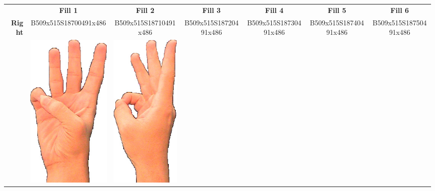 \documentclass{article}
\begin{document}
\begin{center}
\begin{tabular}{r*{6}{c}}
&\textbf{Fill 1}&\textbf{Fill 2}&\textbf{Fill 3}&\textbf{Fill 4}&\textbf{Fill 5}&\textbf{Fill 6}\\
\multirow{2}{*}{\textbf{Right}}&
B509x515S18700491x486&
B509x515S18710491x486&
B509x515S18720491x486&
B509x515S18730491x486&
B509x515S18740491x486&
B509x515S18750491x486\\
&
\includegraphics[scale=0.1]{images/06-02-1.jpg}&
\includegraphics[scale=0.1]{images/06-02-2.jpg}&

\end{tabular}
\end{center}
\end{document}

